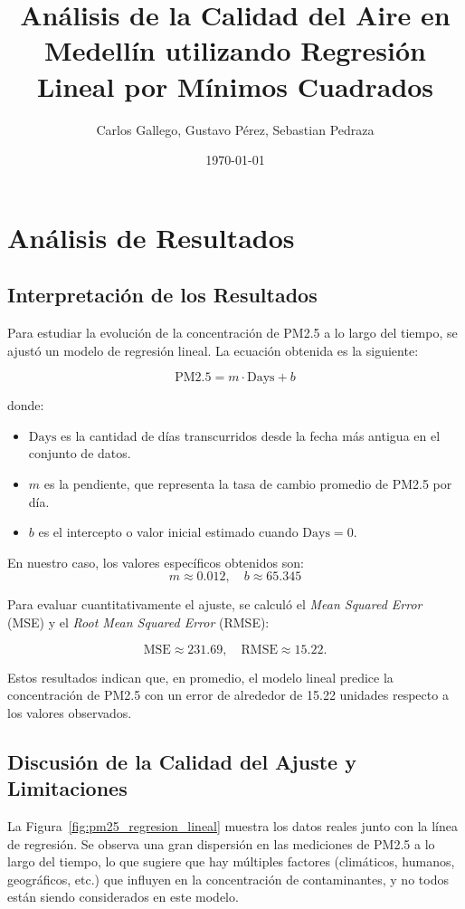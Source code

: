 \documentclass[a4paper,12pt]{article} %
\title{Análisis de la Calidad del Aire en Medellín utilizando Regresión Lineal por Mínimos Cuadrados}
\author{Carlos Gallego, Gustavo Pérez, Sebastian Pedraza}
\date{\today}
\begin{document}
\maketitle

\section{Análisis de Resultados}

\subsection{Interpretación de los Resultados}

Para estudiar la evolución de la concentración de PM2.5 a lo largo del tiempo, se ajustó un modelo de regresión lineal. La ecuación obtenida es la siguiente:

\begin{equation}
    \text{PM2.5} = m \cdot \text{Days} + b
\end{equation}

donde:
\begin{itemize}
    \item \(\text{Days}\) es la cantidad de días transcurridos desde la fecha más antigua en el conjunto de datos.
    \item \(m\) es la pendiente, que representa la tasa de cambio promedio de PM2.5 por día.
    \item \(b\) es el intercepto o valor inicial estimado cuando \(\text{Days} = 0\).
\end{itemize}

En nuestro caso, los valores específicos obtenidos son:
\[
m \approx 0.012, \quad b \approx 65.345
\]

Para evaluar cuantitativamente el ajuste, se calculó el \textit{Mean Squared Error} (MSE) y el \textit{Root Mean Squared Error} (RMSE):

\[
\text{MSE} \approx 231.69,
\quad
\text{RMSE} \approx 15.22.
\]

Estos resultados indican que, en promedio, el modelo lineal predice la concentración de PM2.5 con un error de alrededor de 15.22 unidades respecto a los valores observados.

\subsection{Discusión de la Calidad del Ajuste y Limitaciones}

La Figura~\ref{fig:pm25_regresion_lineal} muestra los datos reales junto con la línea de regresión. Se observa una gran dispersión en las mediciones de PM2.5 a lo largo del tiempo, lo que sugiere que hay múltiples factores (climáticos, humanos, geográficos, etc.) que influyen en la concentración de contaminantes, y no todos están siendo considerados en este modelo.
\end{document}
